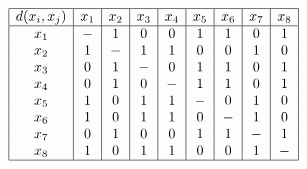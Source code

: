 \documentclass[12pt]{article}
\begin{document}
\begin{enumerate}[leftmargin=\labelsep, label=\textbf{\arabic*.)}]
\begin{itemize}
                    \begin{minipage}{1\textwidth}
                        \begin{center}
                            \[\begin{array}{|c|c|c|c|c|c|c|c|c|}
                                    \hline
                                    d(x_i, x_j) & x_1 & x_2 & x_3 & x_4 & x_5 & x_6 & x_7 & x_8 \\
                                    \hline
                                    x_1         & -   & 1   & 0   & 0   & 1   & 1   & 0   & 1   \\
                                    x_2         & 1   & -   & 1   & 1   & 0   & 0   & 1   & 0   \\
                                    x_3         & 0   & 1   & -   & 0   & 1   & 1   & 0   & 1   \\
                                    x_4         & 0   & 1   & 0   & -   & 1   & 1   & 0   & 1   \\
                                    x_5         & 1   & 0   & 1   & 1   & -   & 0   & 1   & 0   \\
                                    x_6         & 1   & 0   & 1   & 1   & 0   & -   & 1   & 0   \\
                                    x_7         & 0   & 1   & 0   & 0   & 1   & 1   & -   & 1   \\
                                    x_8         & 1   & 0   & 1   & 1   & 0   & 0   & 1   & -   \\
                                    \hline
                                \end{array}\]
                        \end{center}
                    \end{minipage}

                    \vspace{0.5em}


\end{itemize}
\end{enumerate}
\end{document}
